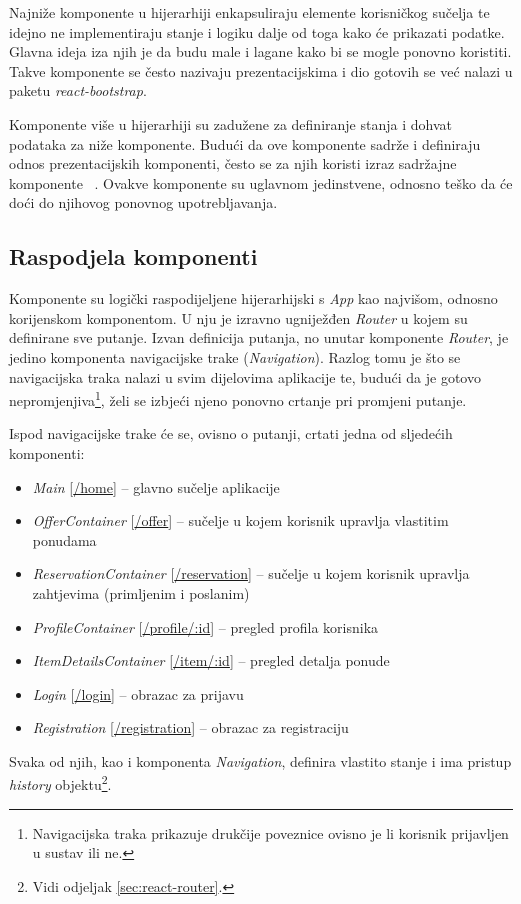 \documentclass[times, utf8, zavrsni, numeric]{fer}
\newcommand{\razmakp}{\vspace{18pt}}
\newcommand{\razmaks}{\vspace{10pt}}
\begin{document}
Najniže komponente u hijerarhiji enkapsuliraju elemente korisničkog sučelja te idejno ne implementiraju stanje i logiku dalje od toga kako će prikazati podatke.
Glavna ideja iza njih je da budu male i lagane kako bi se mogle ponovno koristiti.
Takve komponente se često nazivaju prezentacijskima i dio gotovih se već nalazi u paketu \emph{react-bootstrap}.

Komponente više u hijerarhiji su zadužene za definiranje stanja i dohvat podataka za niže komponente.
Budući da ove komponente sadrže i definiraju odnos prezentacijskih komponenti, često se za njih koristi izraz \glqq sadržajne komponente\grqq ~ \citep{componentTypes}.
Ovakve komponente su uglavnom jedinstvene, odnosno teško da će doći do njihovog ponovnog upotrebljavanja.

\newpage


\subsection{Raspodjela komponenti}

Komponente su logički raspodijeljene hijerarhijski s \emph{App} kao najvišom, odnosno korijenskom komponentom.
U nju je izravno ugniježđen \emph{Router} u kojem su definirane sve putanje.
Izvan definicija putanja, no unutar komponente \emph{Router}, je jedino komponenta navigacijske trake (\emph{Navigation}).
Razlog tomu je što se navigacijska traka nalazi u svim dijelovima aplikacije te, budući da je gotovo nepromjenjiva\footnote{Navigacijska traka prikazuje drukčije poveznice ovisno je li korisnik prijavljen u sustav ili ne.}, želi se izbjeći njeno ponovno crtanje pri promjeni putanje.

\razmakp

Ispod navigacijske trake će se, ovisno o putanji, crtati jedna od sljedećih komponenti:
\begin{itemize}
  \item \emph{Main} [\url{/home}] -- glavno sučelje aplikacije
  \item \emph{OfferContainer} [\url{/offer}] -- sučelje u kojem korisnik upravlja vlastitim ponudama
  \item \emph{ReservationContainer} [\url{/reservation}] -- sučelje u kojem korisnik upravlja zahtjevima (primljenim i poslanim)
  \item \emph{ProfileContainer} [\url{/profile/:id}] -- pregled profila korisnika
  \item \emph{ItemDetailsContainer} [\url{/item/:id}] -- pregled detalja ponude
  \item \emph{Login} [\url{/login}] -- obrazac za prijavu
  \item \emph{Registration} [\url{/registration}] -- obrazac za registraciju
\end{itemize}
\razmaks
Svaka od njih, kao i komponenta \emph{Navigation}, definira vlastito stanje i ima pristup \emph{history} objektu\footnote{Vidi odjeljak \ref{sec:react-router}.}.
\end{document}
